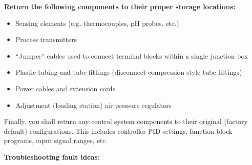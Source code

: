 \vskip 10pt

\indent
{\bf Return the following components to their proper storage locations:}

\begin{itemize}
\item{} Sensing elements (e.g. thermocouples, pH probes, etc.)
\item{} Process transmitters
\item{} ``Jumper'' cables used to connect terminal blocks within a single junction box
\item{} Plastic tubing and tube fittings (disconnect compression-style tube fittings)
\item{} Power cables and extension cords
\item{} Adjustment (loading station) air pressure regulators
\end{itemize}

\vskip 10pt

Finally, you shall return any control system components to their original (factory default) configurations.  This includes controller PID settings, function block programs, input signal ranges, etc.















{\bf Troubleshooting fault ideas:}

